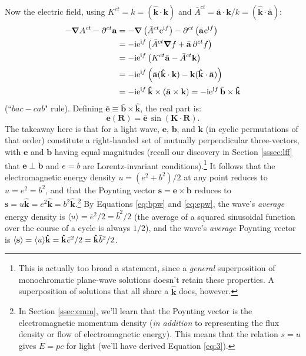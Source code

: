 \documentclass[12pt]{article}
\renewcommand{\vv}[1]{\mathbf{#1}}
\newcommand{\del}{\boldsymbol{\nabla}}
\begin{document}
Now the electric field, using $K^{ct} = k = (\vv{\hat{k}} \cdot \vv k)$ and $\bar{A}^{ct} = \bar{\vv a} \cdot \vv k / k = (\vv{\hat{k}} \cdot \bar{\vv a} )$:
\begin{equation*}
\begin{aligned}
- \del A^{ct} - \partial^{ct} \vv a &= - \del \left( \bar{A}^{ct} \mathrm{e}^{\mathrm{i} f} \right) - \partial^{ct} \left( \bar{\vv a} \mkern1mu \mathrm{e}^{\mathrm{i} f} \right) \\
&= - \mathrm{i} \mathrm{e}^{\mathrm{i} f} \left( \bar{A}^{ct} \del f + \bar{\vv a} \, \partial^{ct} f \right) \\
&= - \mathrm{i} \mathrm{e}^{\mathrm{i} f} \left( K^{ct} \bar{\vv a} - \bar{A}^{ct} \vv k \right) \\[1pt]
&= - \mathrm{i} \mathrm{e}^{\mathrm{i} f} \left( \bar{\vv a} (\vv{\hat{k}} \cdot \vv k )  - \vv k (\vv{\hat{k}} \cdot \bar{\vv a} ) \right) \\[1pt]
&= - \mathrm{i} \mathrm{e}^{\mathrm{i} f} \, \vv{\hat{k}} \times (\bar{\vv a} \times \vv k) = - \mathrm{i} \mathrm{e}^{\mathrm{i} f} \, \bar{\vv b} \times \vv{\hat{k}}
\end{aligned}
\end{equation*}
(``$bac - cab$" rule). Defining $\bar{\vv e} \equiv \bar{\vv b} \times \vv{\hat{k}}$, the real part is:
\begin{equation}\label{eq:epw}
\vv e (\vv R) = \bar{\vv e} \, \sin \left( \vv K \cdot \vv R \right) .
\end{equation}
The takeaway here is that for a light wave, $\vv e$, $\vv b$, and $\vv k$ (in cyclic permutations of that order) constitute a right-handed set of mutually perpendicular three-vectors, with $\vv e$ and $\vv b$ having equal magnitudes (recall our discovery in Section \ref{sssec:lff} that $\vv e \perp \vv b$ and $e = b$ are Lorentz-invariant conditions).\footnote{This is actually too broad a statement, since a \emph{general} superposition of monochromatic plane-wave solutions doesn't retain these properties. A superposition of solutions that all share a $\vv{\hat{k}}$ does, however.} It follows that the electromagnetic energy density $u = (e^2 + b^2) / 2$ at any point reduces to $u = e^2 = b^2$, and that the Poynting vector $\vv s = \vv e \times \vv b$ reduces to ${\vv s = u \vv{\hat{k}} = e^2 \vv{\hat{k}} = b^2 \vv{\hat{k}}}$.\footnote{\label{fn:epc}In Section \ref{ssec:emm}, we'll learn that the Poynting vector is the electromagnetic momentum density (\emph{in addition} to representing the flux density or flow of electromagnetic energy). This means that the relation $s = u$ gives $E = pc$ for light (we'll have derived Equation \ref{eq:3}).} By Equations \ref{eq:bpw} and \ref{eq:epw}, the wave's \emph{average} energy density is $\langle u \rangle = \bar{e}^2 / 2 = \bar{b}^2 / 2$ (the average of a squared sinusoidal function over the course of a cycle is always $1/2$), and the wave's \emph{average} Poynting vector is $\langle \vv s \rangle = \langle u \rangle \vv{\hat{k}} = \vv{\hat{k}} \mkern1mu \bar{e}^2 / 2 = \vv{\hat{k}} \mkern1mu \bar{b}^2 / 2$.
\end{document}
